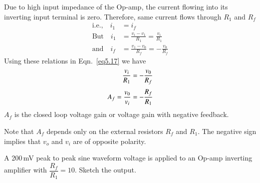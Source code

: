 \noindent
Due to high input impedance of the Op-amp, the current flowing into its inverting input terminal is zero. Therefore, same current flows through $R_{1}$ and $R_{f}$
\begin{align}
\text{i.e.,}\quad i_{1} &= i_{f}\label{eq5.17}\\[3pt]
\text{But}\quad i_{1} &= \frac{v_{i}-v_{1}}{R_{1}}=\frac{v_{i}}{R_{1}}\label{eq5.18}\\[3pt]
\text{and}\quad i_{f} &= \frac{v_{1}-v_{0}}{R_{f}}=-\frac{v_{0}}{R_{f}}\label{eq5.19}
\end{align}
Using these relations in Eqn.~\eqref{eq5.17} we have
\begin{align}
\frac{v_{i}}{R_{1}} &=-\frac{v_{0}}{R_{f}}\notag\\[3pt]
A_{f}=\frac{v_{0}}{v_{i}} &= -\frac{R_{f}}{R_{1}}\label{eq5.20}
\end{align}
$A_{f}$ is the closed loop voltage gain or voltage gain with negative feedback.

Note that $A_{f}$ depends only on the external resistors $R_{f}$ and $R_{1}$. The negative sign implies that $v_{o}$ and $v_{i}$ are of opposite polarity.

\eject

\begin{example}\label{exam5.6}
A 200\,mV peak to peak sine waveform voltage is applied to an Op-amp inverting amplifier with $\dfrac{R_{f}}{R_{1}}=10$. Sketch the output.
\end{example}

